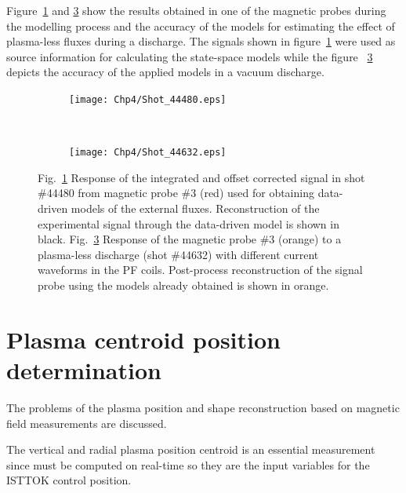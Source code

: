 Figure~\ref{fig:44480} and \ref{fig:44632} show the results obtained in one of the magnetic probes during the modelling process and the accuracy of the models for estimating the effect of plasma-less fluxes during a discharge. The signals shown in figure~\ref{fig:44480} were used as source information for calculating the state-space models while the figure ~\ref{fig:44632} depicts the accuracy of the applied models in a vacuum discharge.

\begin{figure}
	\begin{subfigure}[b]{0.47\textwidth}
		\texttt{[image: Chp4/Shot\_44480.eps]}  
		\caption{\label{fig:44480} }
	\end{subfigure}
~
	\begin{subfigure}[b]{0.47\textwidth}
		\texttt{[image: Chp4/Shot\_44632.eps]}        
		\caption{\label{fig:44632}}
	\end{subfigure}
	
	\caption{Fig.~\ref{fig:44480} Response of the integrated and offset corrected signal in shot \#44480 from magnetic probe \#3 (red) used for obtaining data-driven models of the external fluxes. Reconstruction of the experimental signal through the data-driven model is shown in black. Fig.~\ref{fig:44632} Response of the  magnetic probe \#3 (orange) to a plasma-less discharge (shot \#44632) with different current waveforms in the PF coils. Post-process reconstruction of the  signal probe using the  models already obtained   is shown in orange. }
\end{figure}


\section{Plasma centroid position determination}

The problems of the plasma position and shape reconstruction based on magnetic field measurements are discussed.

The vertical and radial plasma position centroid is an essential measurement  since must be computed on real-time so they are the input variables for the ISTTOK control position.
